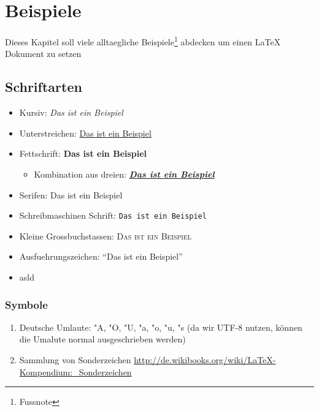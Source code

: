 \chapter{Beispiele}
\label{cha:beispiele}
	Dieses Kapitel soll viele alltaegliche Beispiele\footnote{Fussnote} abdecken um einen {\LaTeX} Dokument zu setzen

		\section{Schriftarten}
		\label{sec:schriftarten} 
			\begin{itemize}
				\item Kursiv: \emph{Das ist ein Beispiel}
				\item Unterstreichen: \underline{Das ist ein Beispiel}
				\item Fettschrift: \textbf{Das ist ein Beispiel}
				\begin{itemize} 
					\item Kombination aus dreien: \underline{\textbf{\emph{Das ist ein Beispiel}}}						\end{itemize} 
				\item Serifen: \textsf{Das ist ein Beispiel}
				\item Schreibmaschinen Schrift: \texttt{Das ist ein Beispiel}
				\item Kleine Grossbuchstassen: \textsc{Das ist ein Beispiel}
				\item Ausfuehrungszeichen: ``Das ist ein Beispiel''
				\item asld
			\end{itemize}
			
		
			\subsection{Symbole}
				\begin{enumerate}
				\item Deutsche Umlaute: "A, "O, "U, "a, "o, "u, "s (da wir UTF-8 nutzen, können die Umalute normal ausgeschrieben werden)
				\item Sammlung von Sonderzeichen \url{http://de.wikibooks.org/wiki/LaTeX-Kompendium:_Sonderzeichen}
				\end{enumerate}
				

